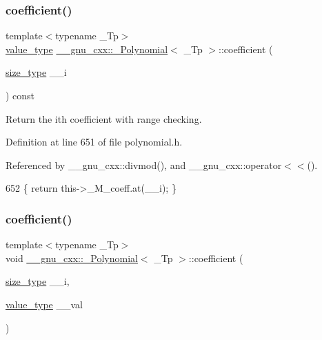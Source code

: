 \subsubsection{\texorpdfstring{coefficient()}{coefficient()}\hspace{0.1cm}{\footnotesize\ttfamily [1/2]}}
{\footnotesize\ttfamily template$<$typename \+\_\+\+Tp$>$ \\
\hyperlink{class____gnu__cxx_1_1__Polynomial_a725563351f50e76084a7a016c06f8a53}{value\+\_\+type} \hyperlink{class____gnu__cxx_1_1__Polynomial}{\+\_\+\+\_\+gnu\+\_\+cxx\+::\+\_\+\+Polynomial}$<$ \+\_\+\+Tp $>$\+::coefficient (\begin{DoxyParamCaption}\item[{\hyperlink{class____gnu__cxx_1_1__Polynomial_a8b25fcfd4acaad0c5c08b649c22da28a}{size\+\_\+type}}]{\+\_\+\+\_\+i }\end{DoxyParamCaption}) const\hspace{0.3cm}{\ttfamily [inline]}}

Return the {\ttfamily ith} coefficient with range checking. 

Definition at line 651 of file polynomial.\+h.



Referenced by \+\_\+\+\_\+gnu\+\_\+cxx\+::divmod(), and \+\_\+\+\_\+gnu\+\_\+cxx\+::operator$<$$<$().


\begin{DoxyCode}
652       \{ \textcolor{keywordflow}{return} this->\_M\_coeff.at(\_\_i); \}
\end{DoxyCode}
\mbox{\label{class____gnu__cxx_1_1__Polynomial_a191611909a0461c449984a0898bce38f}} 
\subsubsection{\texorpdfstring{coefficient()}{coefficient()}\hspace{0.1cm}{\footnotesize\ttfamily [2/2]}}
{\footnotesize\ttfamily template$<$typename \+\_\+\+Tp$>$ \\
void \hyperlink{class____gnu__cxx_1_1__Polynomial}{\+\_\+\+\_\+gnu\+\_\+cxx\+::\+\_\+\+Polynomial}$<$ \+\_\+\+Tp $>$\+::coefficient (\begin{DoxyParamCaption}\item[{\hyperlink{class____gnu__cxx_1_1__Polynomial_a8b25fcfd4acaad0c5c08b649c22da28a}{size\+\_\+type}}]{\+\_\+\+\_\+i,  }\item[{\hyperlink{class____gnu__cxx_1_1__Polynomial_a725563351f50e76084a7a016c06f8a53}{value\+\_\+type}}]{\+\_\+\+\_\+val }\end{DoxyParamCaption})\hspace{0.3cm}{\ttfamily [inline]}}

